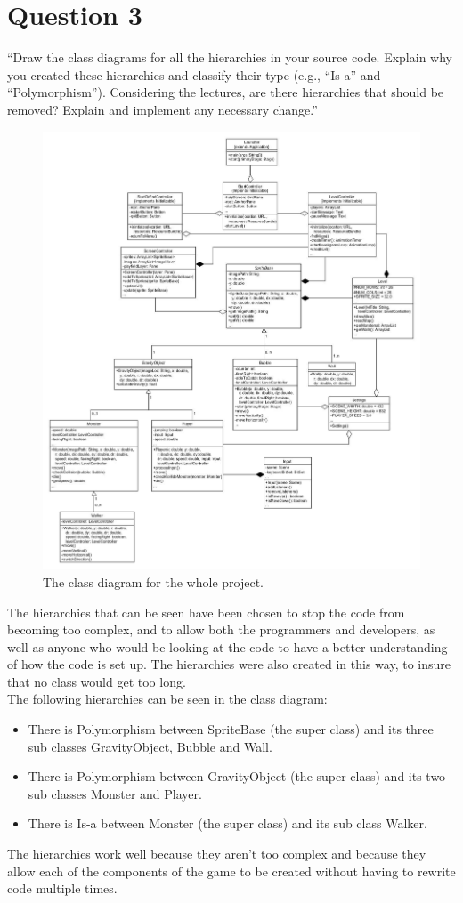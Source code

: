 \section{Question 3}

``Draw the class diagrams for all the hierarchies in your source code. Explain why you created these
hierarchies and classify their type (e.g., “Is-a” and “Polymorphism”). Considering the lectures, are
there hierarchies that should be removed? Explain and implement any necessary change.''

\begin{figure}[h]
\includegraphics[width=\textwidth]{classDiagramsUML_3.jpg}
\caption{The class diagram for the whole project.}
\end{figure}

\noindent The hierarchies that can be seen have been chosen to stop the code from becoming too complex, and to allow both the programmers and developers, as well as anyone who would be looking at the code to have a better understanding of how the code is set up. The hierarchies were also created in this way, to insure that no class would get too long.
\\
\noindent The following hierarchies can be seen in the class diagram:
\begin{itemize}
\itemsep0em 
\item There is Polymorphism between SpriteBase (the super class) and its three sub classes GravityObject, Bubble and Wall.
\item There is Polymorphism between GravityObject (the super class) and its two sub classes Monster and Player.
\item There is Is-a between Monster (the super class) and its sub class Walker.\\
\end{itemize} 

\noindent The hierarchies work well because they aren't too complex and because they allow each of the components of the game to be created without having to rewrite code multiple times.     